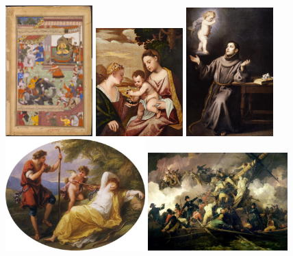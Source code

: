 \documentclass[11pt,a4paper,draft]{report}
\begin{document}
\begin{multicols}{2}
\begin{figure}[tbp]
\centering
\includegraphics[width=0.30\textwidth]{basawan_2009BX3686}
\includegraphics[width=0.30\textwidth]{titian_eu_741}
\includegraphics[width=0.30\textwidth]{murillo_1974p24}
\includegraphics[width=0.48\textwidth]{kauffmann_va_pc_2006an1773}
\includegraphics[width=0.48\textwidth]{loutherbourg_k264}

\end{figure}
\end{multicols}
\end{document}
